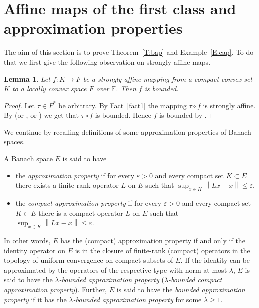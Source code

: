 \documentclass{amsart}
\numberwithin{equation}{section}
\newtheorem{lemma}[thm]{Lemma}
\theoremstyle{definition}
\def\ep{\varepsilon}
\def\ef{\mathbb F}
\newcommand{\norm}[1]{\left\|#1\right\|}
\begin{document}
\section{Affine maps of the first class and approximation properties}\label{sec:example}

The aim of this section is to prove Theorem~\ref{T:bap} and Example~\ref{E:cap}. To do that we first give the following observation on strongly affine maps.

\begin{lemma}\label{4.3}
Let $f\colon K\to F$ be a strongly affine mapping from a compact convex set $K$ to a locally convex space $F$ over $\ef$.
Then $f$ is bounded.\end{lemma}

\begin{proof} Let $\tau\in F^*$ be arbitrary. By Fact~\ref{fact1} the mapping $\tau\circ f$ is strongly affine. By  \cite[Theorem~I.2.6]{alfsen} (or \cite[Section~14]{phelps-choquet}, \cite{sray-om} or \cite[Lemma 4.5]{lmns}) we get that $\tau\circ f$ is bounded. Hence $f$ is bounded by \cite[Theorem 4 on p. 151]{jarchow}.
\end{proof}

We continue by recalling definitions of some approximation properties of Banach spaces.

A Banach space $E$ is said to have
\begin{itemize}
  \item the \emph{approximation property} if for every $\ep>0$ and every compact set $K\subset E$ there exists a finite-rank operator $L$ on $E$ such that $\sup_{x\in K}\norm{Lx-x}\le \ep$.
	\item the \emph{compact approximation property} if for every $\ep>0$ and every compact set $K\subset E$ there is a compact operator $L$ on $E$ such that $\sup_{x\in K}\norm{Lx-x}\le \ep$.
\end{itemize}

In other words, $E$ has the (compact) approximation property if and only if the identity operator on $E$ is in the closure of finite-rank (compact) operators in the topology of uniform convergence on compact subsets of $E$. If the identity can be approximated by the operators of the respective type with norm at most $\lambda$, $E$ is said to have the \emph{$\lambda$-bounded approximation property} (\emph{$\lambda$-bounded compact approximation property}). Further, $E$ is said to have the \emph{bounded approximation property} if it has
the \emph{$\lambda$-bounded approximation property} for some $\lambda\ge1$.
\end{document}
